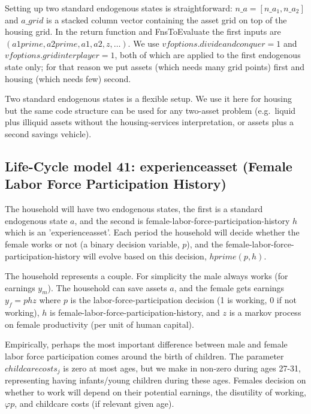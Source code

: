 Setting up two standard endogenous states is straightforward: $n\_{}a=[n\_{}a_1,n\_{}a_2]$ and $a\_{}grid$ is a stacked column vector containing the asset grid on top of the housing grid. In the return function and FnsToEvaluate the first inputs are $(a1prime,a2prime,a1,a2,z,\dots)$. We use $vfoptions.divideandconquer=1$ and $vfoptions.gridinterplayer=1$, both of which are applied to the first endogenous state only; for that reason we put assets (which needs many grid points) first and housing (which needs few) second.

Two standard endogenous states is a flexible setup. We use it here for housing but the same code structure can be used for any two-asset problem (e.g.\ liquid plus illiquid assets without the housing-services interpretation, or assets plus a second savings vehicle).

\subsection{Life-Cycle model 41: experienceasset (Female Labor Force Participation History)}
The household will have two endogenous states, the first is a standard endogenous state $a$, and the second is female-labor-force-participation-history $h$ which is an 'experienceasset'. Each period the household will decide whether the female works or not (a binary decision variable, $p$), and the female-labor-force-participation-history will evolve based on this decision, $hprime(p,h)$.

The household represents a couple. For simplicity the male always works (for earnings $y_m$). The household can save assets $a$, and the female gets earnings $y_f=p h z$ where $p$ is the labor-force-participation decision (1 is working, 0 if not working), $h$ is female-labor-force-participation-history, and $z$ is a markov process on female productivity (per unit of human capital).

Empirically, perhaps the most important difference between male and female labor force participation comes around the birth of children. The parameter $childcarecosts_j$ is zero at most ages, but we make in non-zero during ages 27-31, representing having infants/young children during these ages. Females decision on whether to work will depend on their potential earnings, the disutility of working, $\varphi p$, and childcare costs (if relevant given age).

